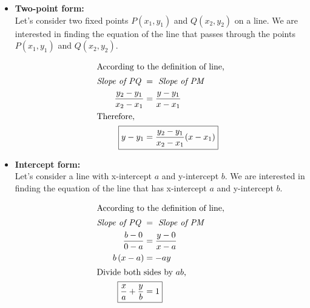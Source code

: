 \begin{itemize}
    \pagebreak
    \item \textbf{Two-point form:}\\[2mm]
    Let's consider two fixed points \( P(x_1, y_1) \) and \( Q(x_2, y_2) \) on a line. We are interested in finding the equation of the line that passes through the points \( P(x_1, y_1) \) and \( Q(x_2, y_2) \).\\[2mm]
        \begin{center}
        \end{center}
        \begin{align*}
            \intertext{According to the definition of line,}
            \textit{Slope of PQ } &= \textit{ Slope of PM} \\
            \frac{y_2 - y_1}{x_2 - x_1} &= \frac{y - y_1}{x - x_1} \\
            \intertext{Therefore,}
            \Aboxed{y - y_1 &= \frac{y_2 - y_1}{x_2 - x_1}(x - x_1)}
        \end{align*}

    \item \textbf{Intercept form:}\\[2mm]
    Let's consider a line with x-intercept \( a \) and y-intercept \( b \). We are interested in finding the equation of the line that has x-intercept \( a \) and y-intercept \( b \).\\[2mm]
        \begin{center}
        \end{center}
        \begin{align*}
            \intertext{According to the definition of line,}
            \textit{Slope of PQ
            } &= \textit{ Slope of PM} \\
            \frac{b - 0}{0 - a} &= \frac{y - 0}{x - a} \\
            b\left(x-a\right) &= -ay \\
            \intertext{Divide both sides by \( ab \),}
            \Aboxed{\frac{x}{a} + \frac{y}{b} &= 1}
        \end{align*}


\end{itemize}
